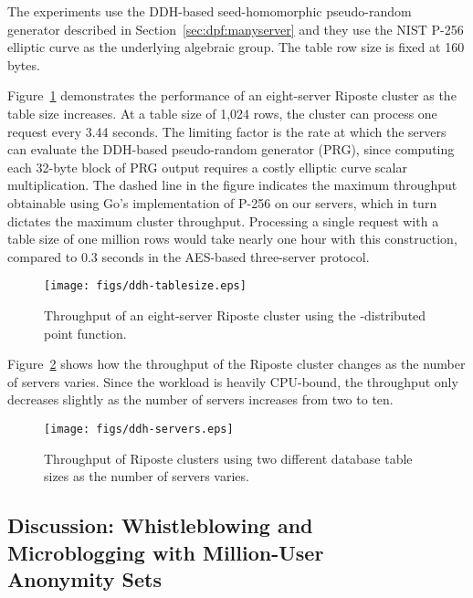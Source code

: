 \documentclass[10pt,twocolumn]{article}
\newcommand{\name}{Riposte\xspace}
\begin{document}
The experiments use the DDH-based seed-homomorphic 
pseudo-random generator described
in Section~\ref{sec:dpf:manyserver} and they use the 
NIST P-256 elliptic curve as the underlying algebraic group.
The table row size is fixed at 160 bytes. 

Figure~\ref{fig:ddh-tablesize} demonstrates the performance
of an eight-server \name cluster as the table size increases.
At a table size of 1,024 rows, the cluster can process
one request every 3.44 seconds.
The limiting factor is the rate at which the servers can evaluate
the DDH-based pseudo-random generator (PRG),
since computing each 32-byte block of PRG output requires 
a costly elliptic curve scalar multiplication.
The dashed line in the figure indicates the maximum throughput
obtainable using Go's implementation of P-256 on our servers,
which in turn dictates the maximum cluster throughput.
Processing a single request with a table size of one million
rows would take nearly one hour with this construction, compared
to 0.3 seconds in the AES-based three-server protocol.

\begin{figure}
\centering
\texttt{[image: figs/ddh-tablesize.eps]}
\caption{Throughput of an eight-server \name cluster using the 
  -distributed point function.}
\label{fig:ddh-tablesize}
\end{figure}

Figure~\ref{fig:ddh-servers} shows how the throughput of the
\name cluster changes as the number of servers varies.
Since the workload is heavily CPU-bound, the throughput
only decreases slightly as the number of servers increases
from two to ten.

\begin{figure}
\centering
\texttt{[image: figs/ddh-servers.eps]}
\caption{Throughput of \name clusters using two
    different database table sizes as the number 
    of servers varies.}
\label{fig:ddh-servers}
\end{figure}


\subsection{Discussion: Whistleblowing and\\ Microblogging with Million-User\\ Anonymity Sets}
\label{sec:eval:million}
\end{document}
